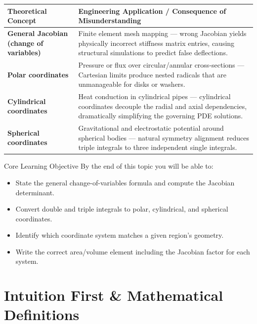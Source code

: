 \documentclass[12pt,a4paper]{article}
\begin{document}
\begin{center}
\begin{tabular}{>{\bfseries}p{5cm} p{9cm}}
\toprule
\textbf{Theoretical Concept} & \textbf{Engineering Application / Consequence of Misunderstanding} \\
\midrule
General Jacobian (change of variables) & Finite element mesh mapping --- wrong Jacobian yields physically
  incorrect stiffness matrix entries, causing structural simulations to predict false deflections. \\
\addlinespace
Polar coordinates & Pressure or flux over circular/annular cross-sections --- Cartesian limits produce
  nested radicals that are unmanageable for disks or washers. \\
\addlinespace
Cylindrical coordinates & Heat conduction in cylindrical pipes --- cylindrical coordinates decouple the
  radial and axial dependencies, dramatically simplifying the governing PDE solutions. \\
\addlinespace
Spherical coordinates & Gravitational and electrostatic potential around spherical bodies --- natural
  symmetry alignment reduces triple integrals to three independent single integrals. \\
\bottomrule
\end{tabular}
\end{center}

\vspace{0.5em}
\begin{learnbox}{Core Learning Objective}
By the end of this topic you will be able to:
\begin{itemize}[leftmargin=1.5em]
  \item State the general change-of-variables formula and compute the Jacobian determinant.
  \item Convert double and triple integrals to polar, cylindrical, and spherical coordinates.
  \item Identify which coordinate system matches a given region's geometry.
  \item Write the correct area/volume element including the Jacobian factor for each system.
\end{itemize}
\end{learnbox}

\section{Intuition First \& Mathematical Definitions}
\end{document}
